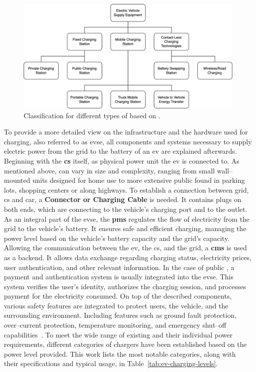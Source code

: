 \begin{figure}[h]
\centering
\includegraphics[width=\textwidth]{resources/images/main/1_fundamentals/ChargingStationClassification.png}
\caption{Classification for different types of  based on \cite{afshar_literature_2020}.}
\label{fig:charging-station-classification}
\end{figure}

\noindent To provide a more detailed view on the infrastructure and the hardware used for charging, also referred to as \acrfull{evse}, all components and systems necessary to supply electric power from the grid to the battery of an \acrfull{ev} are explained afterwards.
Beginning with the \textbf{\acrfull{cs}} itself, as physical power unit the \acrshort{ev} is connected to. As mentioned above,  can vary in size and complexity, ranging from small wall--mounted units designed for home use to more extensive public  found in parking lots, shopping centers or along highways. 
To establish a connection between grid, \acrshort{cs} and car, a \textbf{Connector or Charging Cable} is needed. It contains plugs on both ends, which are connecting to the vehicle's charging port and to the  outlet. 
As an integral part of the \acrshort{evse}, the \textbf{\acrshort{pms}} regulates the flow of electricity from the grid to the vehicle's battery. It ensures safe and efficient charging, managing the power level based on the vehicle's battery capacity and the grid's capacity.
Allowing the communication between the \acrshort{ev}, the \acrfull{cs}, and the grid, a \textbf{\acrshort{cms}} is used as a backend. It allows data exchange regarding charging status, electricity prices, user authentication, and other relevant information.
In the case of public , a payment and authentication system is usually integrated into the \acrshort{evse}. This system verifies the user's identity, authorizes the charging session, and processes payment for the electricity consumed.
On top of the described components, various safety features are integrated to protect users, the vehicle, and the surrounding environment. Including features such as ground fault protection, over--current protection, temperature monitoring, and emergency shut--off capabilities~\cite{littlefuse_designing_2020}.
\noindent To meet the wide range of existing  and their individual power requirements, different categories of chargers have been established based on the power level provided. This work lists the most notable categories, along with their specifications and typical usage, in Table~\ref{tab:ev-charging-levels}. 

